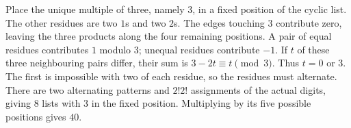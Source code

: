 Place the unique multiple of three, namely $3$, in a fixed position of the cyclic list. The other residues are two $1$s and two $2$s. The edges touching $3$ contribute zero, leaving the three products along the four remaining positions. A pair of equal residues contributes $1$ modulo $3$; unequal residues contribute $-1$. If $t$ of these three neighbouring pairs differ, their sum is $3-2t\equiv t\pmod3$. Thus $t=0$ or $3$. The first is impossible with two of each residue, so the residues must alternate. There are two alternating patterns and $2!2!$ assignments of the actual digits, giving $8$ lists with $3$ in the fixed position. Multiplying by its five possible positions gives $\boxed{40}$.

